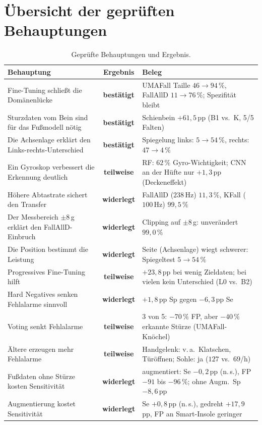 \documentclass[11pt,a4paper,oneside,parskip=half,open=any,
               numbers=noenddot,listof=totoc,bibliography=totoc]{scrreprt}
\newcommand{\ja}{\textcolor{thmgruen!70!black}{\textbf{bestätigt}}}
\newcommand{\nein}{\textcolor{thmrot}{\textbf{widerlegt}}}
\newcommand{\teils}{\textcolor{thmgrau}{\textbf{teilweise}}}
\begin{document}
\section{Übersicht der geprüften Behauptungen}
\begin{table}[H]
\centering\footnotesize
\setlength{\tabcolsep}{3pt}
\caption{Geprüfte Behauptungen und Ergebnis.}
\label{tab:hypothesen}
\begin{tabularx}{\textwidth}{>{\raggedright\arraybackslash}p{5.6cm} c Y}
\toprule
\textbf{Behauptung} & \textbf{Ergebnis} & \textbf{Beleg} \\
\midrule
Fine-Tuning schließt die Domänenlücke & \ja & UMAFall Taille $46 \rightarrow 94\,\%$, FallAllD $11 \rightarrow 76\,\%$; Spezifität bleibt \\
Sturzdaten vom Bein sind für das Fußmodell nötig & \ja & Schienbein $+61{,}5$\,pp (B1 vs.\ K, 5/5 Falten) \\
Die Achsenlage erklärt den Links-rechts-Unterschied & \ja & Spiegelung links: $5 \rightarrow 54\,\%$, rechts: $47 \rightarrow 4\,\%$ \\
Ein Gyroskop verbessert die Erkennung deutlich & \teils & RF: $62\,\%$ Gyro-Wichtigkeit; CNN an der Hüfte nur $+1{,}3$\,pp (Deckeneffekt) \\
Höhere Abtastrate sichert den Transfer & \nein & FallAllD ($238$\,Hz) $11{,}3\,\%$, KFall ($100$\,Hz) $99{,}5\,\%$ \\
Der Messbereich $\pm 8$\,g erklärt den FallAllD-Einbruch & \nein & Clipping auf $\pm 8$\,g: unverändert $99{,}0\,\%$ \\
Die Position bestimmt die Leistung & \nein & Seite (Achsenlage) wiegt schwerer: Spiegeltest $5 \rightarrow 54\,\%$ \\
Progressives Fine-Tuning hilft & \teils & $+23{,}8$\,pp bei wenig Zieldaten; bei vielen kein Unterschied (L0 vs.\ B2) \\
Hard Negatives senken Fehlalarme sinnvoll & \nein & $+1{,}8$\,pp Sp gegen $-6{,}3$\,pp Se \\
Voting senkt Fehlalarme & \teils & 3 von 5: $-70\,\%$ FP, aber $-40\,\%$ erkannte Stürze (UMAFall-Knöchel) \\
Ältere erzeugen mehr Fehlalarme & \teils & Handgelenk: v.\,a.\ Klatschen, Türöffnen; Sohle: ja ($127$ vs.\ $69$/h) \\
Fußdaten ohne Stürze kosten Sensitivität & \nein & augmentiert: Se $-0{,}2$\,pp (n.\,s.), FP $-91$ bis $-96\,\%$; ohne Augm.\ Sp $-8{,}6$\,pp \\
Augmentierung kostet Sensitivität & \nein & Se $+0{,}8$\,pp (n.\,s.), gedreht $+17{,}9$\,pp, FP an Smart-Insole geringer \\

\end{tabularx}
\end{table}
\end{document}
